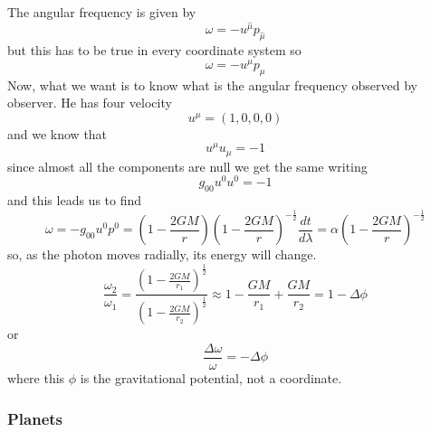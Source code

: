 The angular frequency is given by 
\[
\omega  = - u^{\hat{\mu }}p_{\hat{\mu }}
\]
but this has to be true in every coordinate system so
\[
\omega  = -u^{\mu }p_{\mu }
\]
Now, what we want is to know what is the angular frequency observed by observer.
He has four velocity 
\[
u^{\mu } = \left( 1,0,0,0 \right)
\]
and we know that 
\[
u^{\mu }u_{\mu } = -1
\]
since almost all the components are null we get the same writing
\[
g_{00}u^{0}u^{0} = -1
\]
and this leads us to find
\[
\omega = - g_{00}u^{0}p^{0} = \left( 1- \frac{2GM}{r} \right)\left( 1- \frac{2GM}{r} \right)^{-\frac{1}{2}} \frac{d t}{d \lambda } = \alpha \left( 1 - \frac{2GM}{r} \right)^{-\frac{1}{2}}
\]
so, as the photon moves radially, its energy will change.
\begin{equation}
\frac{\omega _{2}}{\omega _{1}} = \frac{\left( 1 - \frac{2GM}{r_{1}} \right)^{\frac{1}{2}}}{\left( 1- \frac{2GM}{r_{2}} \right)^{\frac{1}{2}}} \approx 1 - \frac{GM}{r_{1}} + \frac{GM}{r_{2}} = 1 - \Delta \phi 
\end{equation}
or 
\[
\frac{\Delta \omega }{\omega } = - \Delta \phi 
\]
where this $\phi $ is the gravitational potential, not a coordinate.

\subsubsection{Planets}

